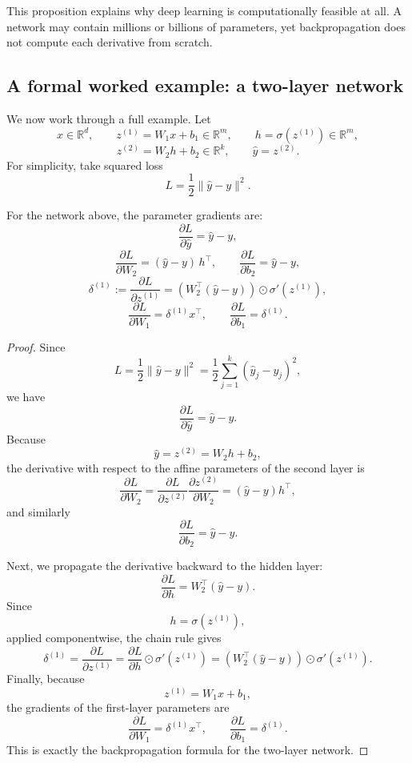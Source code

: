 This proposition explains why deep learning is computationally feasible at all. A network may contain millions or billions of parameters, yet backpropagation does not compute each derivative from scratch.

\subsection*{A formal worked example: a two-layer network}

We now work through a full example. Let
\[
x\in\mathbb R^d,
\qquad
z^{(1)}=W_1x+b_1 \in \mathbb R^m,
\qquad
h=\sigma(z^{(1)}) \in \mathbb R^m,
\]
\[
z^{(2)}=W_2h+b_2 \in \mathbb R^k,
\qquad
\hat y=z^{(2)}.
\]
For simplicity, take squared loss
\[
L=\frac12\|\hat y-y\|^2.
\]

\begin{example}
For the network above, the parameter gradients are:
\[
\frac{\partial L}{\partial \hat y}=\hat y-y,
\]
\[
\frac{\partial L}{\partial W_2}
=
(\hat y-y)\,h^\top,
\qquad
\frac{\partial L}{\partial b_2}
=
\hat y-y,
\]
\[
\delta^{(1)}
:=
\frac{\partial L}{\partial z^{(1)}}
=
\left(W_2^\top(\hat y-y)\right)\odot \sigma'(z^{(1)}),
\]
\[
\frac{\partial L}{\partial W_1}
=
\delta^{(1)}x^\top,
\qquad
\frac{\partial L}{\partial b_1}
=
\delta^{(1)}.
\]
\end{example}

\begin{proof}
Since
\[
L=\frac12\|\hat y-y\|^2
=
\frac12\sum_{j=1}^k (\hat y_j-y_j)^2,
\]
we have
\[
\frac{\partial L}{\partial \hat y}=\hat y-y.
\]
Because
\[
\hat y=z^{(2)}=W_2h+b_2,
\]
the derivative with respect to the affine parameters of the second layer is
\[
\frac{\partial L}{\partial W_2}
=
\frac{\partial L}{\partial z^{(2)}}\frac{\partial z^{(2)}}{\partial W_2}
=
(\hat y-y)h^\top,
\]
and similarly
\[
\frac{\partial L}{\partial b_2}=\hat y-y.
\]

Next, we propagate the derivative backward to the hidden layer:
\[
\frac{\partial L}{\partial h}
=
W_2^\top(\hat y-y).
\]
Since
\[
h=\sigma(z^{(1)}),
\]
applied componentwise, the chain rule gives
\[
\delta^{(1)}
=
\frac{\partial L}{\partial z^{(1)}}
=
\frac{\partial L}{\partial h}\odot \sigma'(z^{(1)})
=
\left(W_2^\top(\hat y-y)\right)\odot \sigma'(z^{(1)}).
\]
Finally, because
\[
z^{(1)}=W_1x+b_1,
\]
the gradients of the first-layer parameters are
\[
\frac{\partial L}{\partial W_1}
=
\delta^{(1)}x^\top,
\qquad
\frac{\partial L}{\partial b_1}
=
\delta^{(1)}.
\]
This is exactly the backpropagation formula for the two-layer network.
\end{proof}

